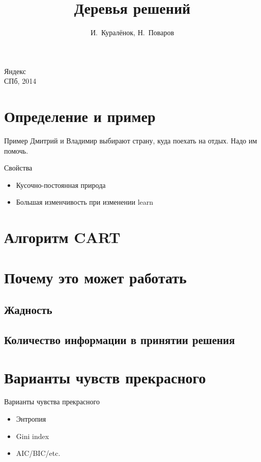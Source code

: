 \documentclass[14pt, fleqn, xcolor={dvipsnames, table}]{beamer}
\title{Деревья решений\\\small{}}
\author[]{\small{%
И.~Куралёнок,
Н.~Поваров}}
\date{}
\begin{document}
\begin{frame}
\maketitle
\small
\begin{center}
\vspace{-60pt}
\normalsize {\color{red}Я}ндекс \\
\vspace{80pt}
\footnotesize СПб, 2014
\end{center}
\end{frame}

\section{Определение и пример}
\begin{frame}{Пример}
Дмитрий и Владимир выбирают страну, куда поехать на отдых. Надо им помочь.
\end{frame}

\begin{frame}{Свойства}
\begin{itemize}
  \item Кусочно-постоянная природа
  \item Большая изменчивость при изменении learn
\end{itemize}
\end{frame}

\section{Алгоритм CART}

\section{Почему это может работать}
\subsection{Жадность}
\subsection{Количество информации в принятии решения}
\section{Варианты чувств прекрасного}
\begin{frame}{Варианты чувства прекрасного}
\begin{itemize}
  \item Энтропия
  \item Gini index
  \item AIC/BIC/etc. 
\end{itemize}
\end{frame}
\end{document}
